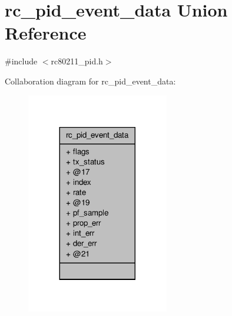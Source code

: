 \hypertarget{unionrc__pid__event__data}{\section{rc\-\_\-pid\-\_\-event\-\_\-data Union Reference}
\label{unionrc__pid__event__data}
}


{\ttfamily \#include $<$rc80211\-\_\-pid.\-h$>$}



Collaboration diagram for rc\-\_\-pid\-\_\-event\-\_\-data\-:
\nopagebreak
\begin{figure}[H]
\begin{center}
\leavevmode
\includegraphics[width=176pt]{unionrc__pid__event__data__coll__graph}
\end{center}
\end{figure}
